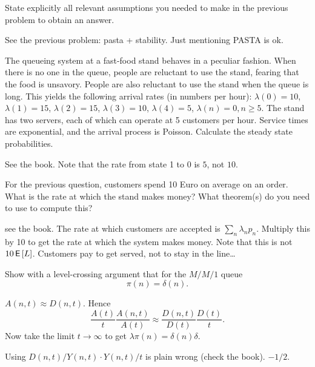 \begin{exercise}[201706]
State explicitly all relevant assumptions you needed to make in the previous problem to obtain an answer.
\begin{solution}
  See the previous problem: pasta + stability. Just mentioning PASTA is ok. 
\end{solution}
\end{exercise}



\begin{exercise}[201706]
 The queueing system at a fast-food stand behaves in a
  peculiar fashion. When there is no one in the queue, people are
  reluctant to use the stand, fearing that the food is
  unsavory. People are also reluctant to use the stand when the queue
  is long. This yields the following arrival rates (in numbers per hour): $\lambda(0) = 10$, $\lambda(1)=15$, $\lambda(2)=15$, $\lambda(3)=10$, $\lambda(4)=5$, $\lambda(n)=0, n\geq 5$. The stand has two servers, each of which can operate at 5 customers per hour. Service times are exponential, and the arrival process is Poisson. 
 Calculate the steady state probabilities.
\begin{solution}
  See the book. Note that the rate from state 1 to 0 is $5$, not $10$. 
\end{solution}
\end{exercise}


\begin{exercise}[201706]
  For the previous question, customers spend 10 Euro on average on an order.
  What is the rate at which the stand makes money?
  What theorem(s) do you need to use to compute this?
\begin{solution}
see the book. 
    The rate at which customers are accepted is $\sum_{n} \lambda_n p_n$. Multiply this by 10 to get the rate at which the system makes money. Note that this is not $10 \,\mathsf{E}\left[L\right]$. Customers pay to get served, not to stay in the line\ldots
\end{solution}
\end{exercise}


\begin{exercise}[201804] 
Show with a level-crossing argument  that for the $M/M/1$ queue 
  \begin{equation}\label{eq:91}
  \pi(n) = \delta(n).
  \end{equation}

\begin{solution}
    $A(n,t) \approx D(n,t)$. Hence
    \begin{equation*}
      \frac{A(t)}{t} \frac{A(n,t)}{A(t)} \approx 
      \frac{D(n, t)}{D(t)} \frac{D(t)}{t}.
    \end{equation*}
Now take the limit $t\to \infty$ to get $\lambda \pi(n) = \delta(n) \delta$. 

Using $D(n,t)/Y(n,t) \cdot Y(n,t)/t$ is plain wrong (check the book). $-1/2$. 
\end{solution}
\end{exercise}


